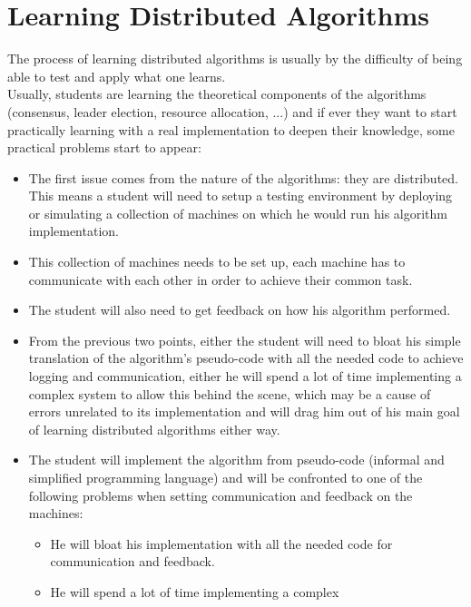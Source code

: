 \documentclass{eplmastersthesis}
\begin{document}
    \section{Learning Distributed Algorithms}

      The process of learning distributed algorithms is usually by the
      difficulty of being able to test and apply what one learns.\\
      Usually, students are learning the theoretical components of the
      algorithms (consensus, leader election, resource allocation, ...)
      and if ever they want to start practically learning with a real
      implementation to deepen their knowledge, some practical problems
      start to appear:

      \begin{itemize}
        \item The first issue comes from the nature of the algorithms: they are
        distributed. This means a student will need to setup a testing
        environment by deploying or simulating a collection of machines on
        which he would run his algorithm implementation.
        \item This collection of machines needs to be set up, each machine has
        to communicate with each other in order to achieve their common task.
        \item The student will also need to get feedback on how his
        algorithm performed.
        \item From the previous two points, either the student will need to
        bloat his simple translation of the algorithm's pseudo-code
        with all the needed code to achieve logging and communication, either
        he will spend a lot of time implementing a complex system to allow
        this behind the scene, which may be a cause of errors unrelated to its
        implementation and will drag him out of his main goal of learning
        distributed algorithms either way.
        \item The student will implement the algorithm from pseudo-code (informal
        and simplified programming language) and will be confronted to one of the
        following problems when setting communication and feedback on the machines:
          \begin{itemize}
            \item He will bloat his implementation with all the needed
            code for communication and feedback.
            \item He will spend a lot of time implementing a complex

\end{itemize}
\end{itemize}
\end{document}
